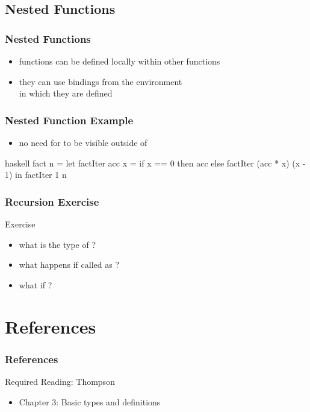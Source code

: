 \documentclass[dvipsnames]{beamer}
\theoremstyle{plain}
\begin{document}
\subsection{Nested Functions}

\begin{frame}
  \frametitle{Nested Functions}

  \begin{itemize}
    \item functions can be defined locally within other functions
    \item they can use bindings from the environment\\
      in which they are defined
  \end{itemize}
\end{frame}

\begin{frame}[fragile]
  \frametitle{Nested Function Example}

  \begin{example}[factorial]
    \begin{itemize}
      \item no need for  to be visible
        outside of 
    \end{itemize}

    \begin{pygments}{haskell}
fact n =
    let
        factIter acc x =
            if x == 0
            then acc
            else factIter (acc * x) (x - 1)
    in
        factIter 1 n
    \end{pygments}
  \end{example}
\end{frame}

\begin{frame}[fragile]
  \frametitle{Recursion Exercise}

  \begin{block}{Exercise}
    \begin{itemize}
      \item what is the type of ?
      \item what happens if called as ?
      \item what if ?
    \end{itemize}
  \end{block}
\end{frame}

\section*{References}

\begin{frame}
  \frametitle{References}

  \begin{block}{Required Reading: Thompson}
    \begin{itemize}
      \item Chapter 3: Basic types and definitions
    \end{itemize}
  \end{block}
\end{frame}
\end{document}
